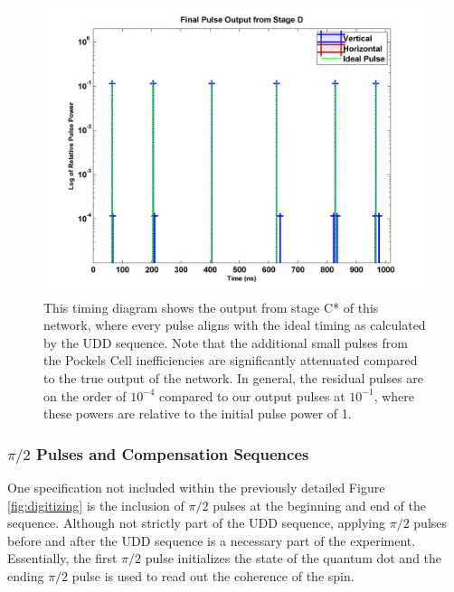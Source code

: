 \documentclass[pdftex,12pt,a4paper]{article}
\begin{document}
\begin{figure}[H]
\centering
\includegraphics[scale=0.6]{OutputPulse.png}
\caption{This timing diagram shows the output from stage C* of this network, where every pulse aligns with the ideal timing as calculated by the UDD sequence. Note that the additional small pulses from the Pockels Cell inefficiencies are significantly attenuated compared to the true output of the network. In general, the residual pulses are on the order of $10^{-4}$ compared to our output pulses at $10^{-1}$, where these powers are relative to the initial pulse power of 1.  }
\label{fig:timing_E}
\end{figure}


    

\subsubsection{$\pi/2$ Pulses and Compensation Sequences}
\label{sec:pi/2}
One specification not included within the previously detailed Figure \ref{fig:digitizing} is the inclusion of $\pi/2$ pulses at the beginning and end of the sequence. Although not strictly part of the UDD sequence, applying $\pi/2$ pulses before and after the UDD sequence is a necessary part of the experiment.  Essentially, the first $\pi/2$ pulse initializes the state of the quantum dot and the ending $\pi/2$ pulse is used to read out the coherence of the spin\cite{clark_ultrafast_2009}. 
\end{document}
